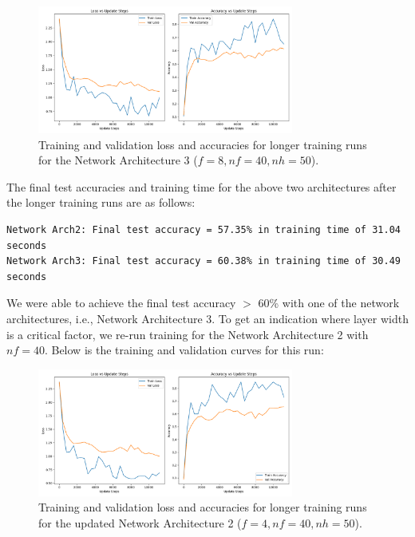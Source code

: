 \documentclass[11pt]{article}
\begin{document}
\begin{figure}[H]
  \centering
  \includegraphics[width=0.75\textwidth]{results/architecture_3_training_plot.png}
  \caption{Training and validation loss and accuracies for longer training runs for the Network Architecture 3 ($f=8, nf=40, nh=50$).}
  \label{fig:longer_training_runs_arch3}
\end{figure}

The final test accuracies and training time for the above two architectures after the longer training runs are as follows:
\begin{lstlisting}[caption={Final test accuracies and training time Arch2 and Arch3 for longer training runs}, label={lst:longer_training_runs_accuracies}]
Network Arch2: Final test accuracy = 57.35% in training time of 31.04 seconds
Network Arch3: Final test accuracy = 60.38% in training time of 30.49 seconds
\end{lstlisting}

We were able to achieve the final test accuracy $>$ 60\% with one of the network architectures, i.e., Network Architecture 3.
To get an indication where layer width is a critical factor, we re-run training for the Network Architecture 2 with $nf=40$. Below is the training and validation curves for this run:

\begin{figure}[H]
  \centering
  \includegraphics[width=0.75\textwidth]{results/architecture_updated_2_training_plot.png}
  \caption{Training and validation loss and accuracies for longer training runs for the updated Network Architecture 2 ($f=4, nf=40, nh=50$).}
  \label{fig:longer_training_runs_arch2_updated}
\end{figure}
\end{document}
